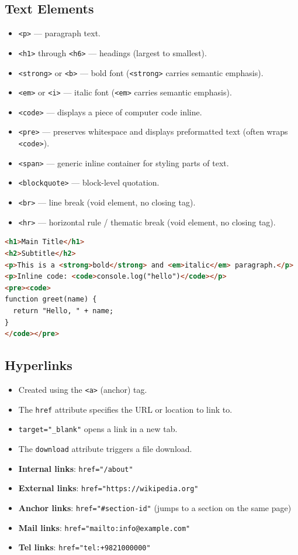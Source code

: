 \documentclass[hidelinks]{article}
\begin{document}
\subsection{Text Elements}
\begin{itemize}
  \item \texttt{<p>} --- paragraph text.
  \item \texttt{<h1>} through \texttt{<h6>} --- headings (largest to smallest).
  \item \texttt{<strong>} or \texttt{<b>} --- bold font (\texttt{<strong>} carries semantic emphasis).
  \item \texttt{<em>} or \texttt{<i>} --- italic font (\texttt{<em>} carries semantic emphasis).
  \item \texttt{<code>} --- displays a piece of computer code inline.
  \item \texttt{<pre>} --- preserves whitespace and displays preformatted text (often wraps \texttt{<code>}).
  \item \texttt{<span>} --- generic inline container for styling parts of text.
  \item \texttt{<blockquote>} --- block-level quotation.
  \item \texttt{<br>} --- line break (void element, no closing tag).
  \item \texttt{<hr>} --- horizontal rule / thematic break (void element, no closing tag).
\end{itemize}

\begin{lstlisting}[language=HTML, caption={Text element examples}]
<h1>Main Title</h1>
<h2>Subtitle</h2>
<p>This is a <strong>bold</strong> and <em>italic</em> paragraph.</p>
<p>Inline code: <code>console.log("hello")</code></p>
<pre><code>
function greet(name) {
  return "Hello, " + name;
}
</code></pre>
\end{lstlisting}

\subsection{Hyperlinks}
\begin{itemize}
  \item Created using the \texttt{<a>} (anchor) tag.
  \item The \texttt{href} attribute specifies the URL or location to link to.
  \item \texttt{target="\_blank"} opens a link in a new tab.
  \item The \texttt{download} attribute triggers a file download.
  \item \textbf{Internal links}: \texttt{href="/about"}
  \item \textbf{External links}: \texttt{href="https://wikipedia.org"}
  \item \textbf{Anchor links}: \texttt{href="\#section-id"} (jumps to a section on the same page)
  \item \textbf{Mail links}: \texttt{href="mailto:info@example.com"}
  \item \textbf{Tel links}: \texttt{href="tel:+9821000000"}
\end{itemize}
\end{document}
